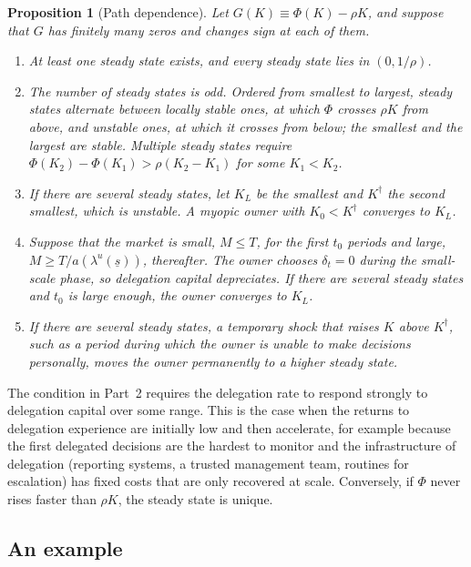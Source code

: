 \documentclass[11pt,a4paper]{article}
\theoremstyle{plain}
\newtheorem{proposition}{Proposition}
\begin{document}
\begin{proposition}[Path dependence]\label{prop:path}
Let $G(K) \equiv \Phi(K) - \rho K$, and suppose that $G$ has finitely many zeros and changes sign at each of them.
\begin{enumerate}
  \item At least one steady state exists, and every steady state lies in $(0, 1/\rho)$.
  \item The number of steady states is odd. Ordered from smallest to largest, steady states alternate between locally stable ones, at which $\Phi$ crosses $\rho K$ from above, and unstable ones, at which it crosses from below; the smallest and the largest are stable. Multiple steady states require $\Phi(K_2) - \Phi(K_1) > \rho (K_2 - K_1)$ for some $K_1 < K_2$.
  \item If there are several steady states, let $K_L$ be the smallest and $K^\dagger$ the second smallest, which is unstable. A myopic owner with $K_0 < K^\dagger$ converges to $K_L$.
  \item Suppose that the market is small, $M \le T$, for the first $t_0$ periods and large, $M \ge T / a(\lambda^u(\underline s))$, thereafter. The owner chooses $\delta_t = 0$ during the small-scale phase, so delegation capital depreciates. If there are several steady states and $t_0$ is large enough, the owner converges to $K_L$.
  \item If there are several steady states, a temporary shock that raises $K$ above $K^\dagger$, such as a period during which the owner is unable to make decisions personally, moves the owner permanently to a higher steady state.
\end{enumerate}
\end{proposition}

The condition in Part~2 requires the delegation rate to respond strongly to delegation capital over some range. This is the case when the returns to delegation experience are initially low and then accelerate, for example because the first delegated decisions are the hardest to monitor and the infrastructure of delegation (reporting systems, a trusted management team, routines for escalation) has fixed costs that are only recovered at scale. Conversely, if $\Phi$ never rises faster than $\rho K$, the steady state is unique.

\subsection{An example}
\end{document}

